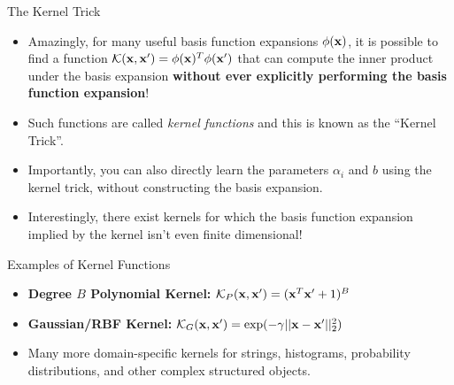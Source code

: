 \documentclass[serif,xcolor=pdftex,dvipsnames,table,hyperref={bookmarks=false}]{beamer}
\begin{document}
\begin{frame}[t]{The Kernel Trick}

\begin{itemize}
\setlength{\itemsep}{8pt}
\item Amazingly, for many useful basis function expansions $\phi({\mathbf{x}})$, it is possible to find a function $\mathcal{K}({\mathbf{x}},{\mathbf{x}}') =\phi({\mathbf{x}})^T\phi({\mathbf{x}}')$ that can compute the inner product under the basis expansion \textbf{without ever explicitly performing the basis function expansion}!

\pause \item Such functions are called \textit{kernel functions} and this is known as the ``Kernel Trick''.

\pause \item Importantly, you can also directly learn the parameters $\alpha_i$ and $b$ using the kernel trick, without constructing the basis expansion.

\pause\item Interestingly, there exist kernels for which the basis function expansion implied by the kernel isn't even finite dimensional!


\end{itemize}
\end{frame}

\begin{frame}[t]{Examples of Kernel Functions}

\begin{itemize}
\setlength{\itemsep}{8pt}
\item \textbf{Degree $B$ Polynomial Kernel:} $\mathcal{K}_P({\mathbf{x}},{\mathbf{x}}') = ({\mathbf{x}}^T{\mathbf{x}}' + 1)^B$

\pause \item \textbf{Gaussian/RBF Kernel:} $\mathcal{K}_G({\mathbf{x}},{\mathbf{x}}') = \exp(-\gamma||{\mathbf{x}}-{\mathbf{x}}'||_2^2)$

\pause \item Many more domain-specific kernels for strings, histograms, probability distributions, and other complex structured objects.

\end{itemize}
\end{frame}
\end{document}

